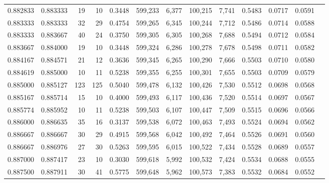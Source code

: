 \begin{tabular}{rrrrrrrrrrrrr}
0.882833 & 0.883333 &    19 &  10 &                                     0.3448 & 599,233 &   6,377 & 100,215 &   7,741 & 0.5483 & 0.0717 & 0.0591 \\
0.883333 & 0.883333 &    32 &  29 &                                     0.4754 & 599,265 &   6,345 & 100,244 &   7,712 & 0.5486 & 0.0714 & 0.0588 \\
0.883333 & 0.883667 &    40 &  24 &                                     0.3750 & 599,305 &   6,305 & 100,268 &   7,688 & 0.5494 & 0.0712 & 0.0584 \\
0.883667 & 0.884000 &    19 &  10 &                                     0.3448 & 599,324 &   6,286 & 100,278 &   7,678 & 0.5498 & 0.0711 & 0.0582 \\
0.884167 & 0.884571 &    21 &  12 &                                     0.3636 & 599,345 &   6,265 & 100,290 &   7,666 & 0.5503 & 0.0710 & 0.0580 \\
0.884619 & 0.885000 &    10 &  11 &                                     0.5238 & 599,355 &   6,255 & 100,301 &   7,655 & 0.5503 & 0.0709 & 0.0579 \\
0.885000 & 0.885127 &   123 & 125 &                                     0.5040 & 599,478 &   6,132 & 100,426 &   7,530 & 0.5512 & 0.0698 & 0.0568 \\
0.885167 & 0.885714 &    15 &  10 &                                     0.4000 & 599,493 &   6,117 & 100,436 &   7,520 & 0.5514 & 0.0697 & 0.0567 \\
0.885774 & 0.885952 &    10 &  11 &                                     0.5238 & 599,503 &   6,107 & 100,447 &   7,509 & 0.5515 & 0.0696 & 0.0566 \\
0.886000 & 0.886635 &    35 &  16 &                                     0.3137 & 599,538 &   6,072 & 100,463 &   7,493 & 0.5524 & 0.0694 & 0.0562 \\
0.886667 & 0.886667 &    30 &  29 &                                     0.4915 & 599,568 &   6,042 & 100,492 &   7,464 & 0.5526 & 0.0691 & 0.0560 \\
0.886667 & 0.886976 &    27 &  30 &                                     0.5263 & 599,595 &   6,015 & 100,522 &   7,434 & 0.5528 & 0.0689 & 0.0557 \\
0.887000 & 0.887417 &    23 &  10 &                                     0.3030 & 599,618 &   5,992 & 100,532 &   7,424 & 0.5534 & 0.0688 & 0.0555 \\
0.887500 & 0.887911 &    30 &  41 &                                     0.5775 & 599,648 &   5,962 & 100,573 &   7,383 & 0.5532 & 0.0684 & 0.0552 \\

\end{tabular}
